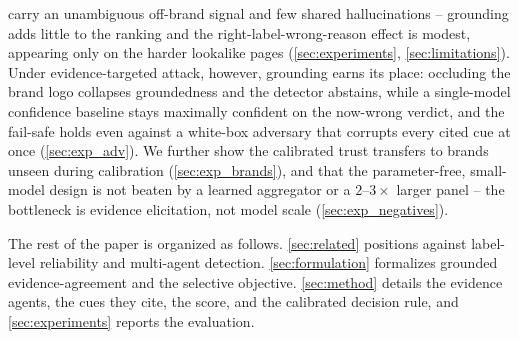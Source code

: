 \begin{compactitem}
carry an unambiguous off-brand signal and few shared hallucinations -- grounding adds
little to the ranking and the right-label-wrong-reason effect is modest, appearing only
on the harder lookalike pages (\autoref{sec:experiments}, \autoref{sec:limitations}).
Under evidence-targeted attack, however, grounding earns its place: occluding the brand
logo collapses groundedness and the detector abstains, while a single-model confidence
baseline stays maximally confident on the now-wrong verdict, and the fail-safe holds even
against a white-box adversary that corrupts every cited cue at once (\autoref{sec:exp_adv}).
We further show the calibrated trust transfers to brands unseen during calibration
(\autoref{sec:exp_brands}), and that the parameter-free, small-model design is not beaten by a
learned aggregator or a $2$--$3\times$ larger panel -- the bottleneck is evidence elicitation,
not model scale (\autoref{sec:exp_negatives}).
\end{compactitem}

The rest of the paper is organized as follows. \autoref{sec:related} positions
\toolname{} against label-level reliability and multi-agent detection.
\autoref{sec:formulation} formalizes grounded evidence-agreement and the selective
objective. \autoref{sec:method} details the evidence agents, the cues they cite, the score,
and the calibrated decision rule, and
\autoref{sec:experiments} reports the evaluation.
